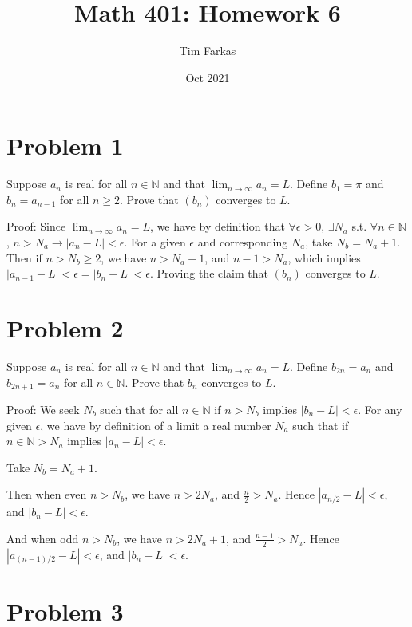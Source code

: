 \documentclass{article}
\title{Math 401: Homework 6}
\author{Tim Farkas}
\date{Oct 2021}
\begin{document}
\maketitle

\section*{Problem 1}

Suppose $a_n$ is real for all $n \in \mathbb{N}$ and that $\lim_{n \rightarrow \infty} a_n = L$. 
Define $b_1 = \pi$ and $b_n = a_{n-1}$ for all $n \geq 2$. 
Prove that $(b_n)$ converges to $L$.  

Proof: Since $\lim_{n \rightarrow \infty} a_n = L$, we have by definition that $\forall \epsilon > 0$, $\exists N_a$ s.t. $\forall n \in \mathbb{N}$, $n > N_a \rightarrow \left|a_n - L\right| < \epsilon$. 
For a given $\epsilon$ and corresponding $N_a$, take $N_b = N_a + 1$.
Then if $n > N_b \geq 2$, we have $n > N_a + 1$, and $n - 1 > N_a$, which implies
$\left|a_{n-1} - L\right| < \epsilon = \left|b_n - L\right| < \epsilon$. 
Proving the claim that $(b_n)$ converges to $L$. 

\section*{Problem 2}

Suppose $a_n$ is real for all $n \in \mathbb{N}$ and that $\lim_{n \rightarrow \infty} a_n = L$. 
Define $b_{2n} = a_n$ and $b_{2n+1} = a_n$ for all $n \in \mathbb{N}$. 
Prove that $b_n$ converges to $L$. 

Proof: We seek $N_b$ such that for all $n \in \mathbb{N}$ if $n > N_b$ implies $\left|b_n - L\right| < \epsilon$. 
For any given $\epsilon$, we have by definition of a limit a real number $N_a$ such that if $n \in \mathbb{N} > N_a$ implies $\left|a_n - L\right| < \epsilon$.

Take $N_b = N_a + 1$. 

Then when even $n > N_b$, we have $n > 2N_a$, and $\frac{n}{2} > N_a$. Hence $\left|a_{n/2} - L\right| < \epsilon$, and $\left|b_n - L\right| < \epsilon$. 

And when odd $n > N_b$, we have $n > 2N_a + 1$, and $\frac{n-1}{2} > N_a$. Hence $\left|a_{(n-1)/2} - L\right| < \epsilon$, and $\left|b_n - L\right| < \epsilon$. 

\section*{Problem 3}
\end{document}
